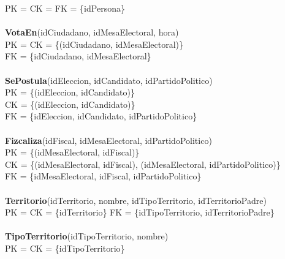   PK = CK = FK = \{idPersona\}\\
\\
\textbf{VotaEn}(idCiudadano, idMesaElectoral, hora)\\
  PK = CK = \{(idCiudadano, idMesaElectoral)\}\\
  FK = \{idCiudadano, idMesaElectoral\}\\
\\
\textbf{SePostula}(idEleccion, idCandidato, idPartidoPolitico)\\
  PK = \{(idEleccion, idCandidato)\}\\
  CK = \{(idEleccion, idCandidato)\}\\
  FK = \{idEleccion, idCandidato, idPartidoPolitico\}\\
\\
\textbf{Fizcaliza}(idFiscal, idMesaElectoral, idPartidoPolitico)\\
  PK = \{(idMesaElectoral, idFiscal)\}\\
  CK = \{(idMesaElectoral, idFiscal), (idMesaElectoral, idPartidoPolitico)\}\\
  FK = \{idMesaElectoral, idFiscal, idPartidoPolitico\}\\
\\
\textbf{Territorio}(idTerritorio, nombre, idTipoTerritorio, idTerritorioPadre)\\
  PK = CK = \{idTerritorio\}
  FK = \{idTipoTerritorio, idTerritorioPadre\}\\
\\
\textbf{TipoTerritorio}(idTipoTerritorio, nombre)\\
  PK = CK = \{idTipoTerritorio\}\\	